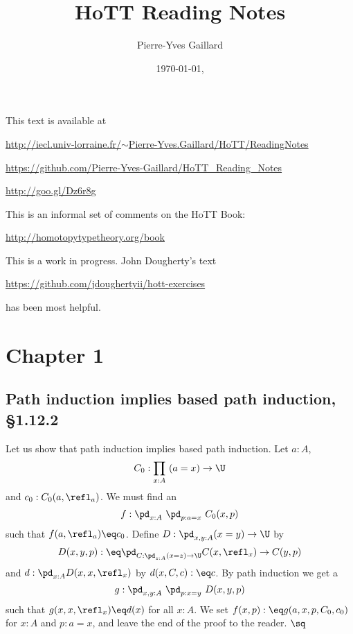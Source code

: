 \documentclass[12pt]{article}
\title{HoTT Reading Notes}
\author{Pierre-Yves Gaillard}
\date{\today, \currenttime}
\begin{document}

\maketitle%

\nn This text is available at 

\nn\href{http://iecl.univ-lorraine.fr/~Pierre-Yves.Gaillard/HoTT/ReadingNotes}{http://iecl.univ-lorraine.fr/$\sim$Pierre-Yves.Gaillard/HoTT/ReadingNotes}


\nn\href{https://github.com/Pierre-Yves-Gaillard/HoTT_Reading_Notes}{https://github.com/Pierre-Yves-Gaillard/HoTT\_Reading\_Notes}

\nn\href{http://goo.gl/Dz6r8g}{http://goo.gl/Dz6r8g}

This is an informal set of comments on the HoTT Book:

\nn\href{http://homotopytypetheory.org/book}{http://homotopytypetheory.org/book}

This is a work in progress. John Dougherty's text 

\nn\href{https://github.com/jdoughertyii/hott-exercises}{https://github.com/jdoughertyii/hott-exercises}

\nn has been most helpful.

\tableofcontents


\section{Chapter 1}

\subsection{Path induction implies based path induction, \S1.12.2}%

Let us show that path induction implies based path induction. Let $a:A$, 
$$
C_0:\prod_{x:A}\ (a=x)\to\U
$$ 
and $c_0:C_0(a,\refl_a)$. We must find an 
$$
f:\pd_{x:A}\ \pd_{p:a=x}\ C_0(x,p)
$$ 
such that $f(a,\refl_a)\eq c_0$. Define $D:\pd_{x,y:A}(x=y)\to\U$ by 
$$
D(x,y,p):\eq\pd_{C:\pd_{z:A}(x=z)\to\U}C(x,\refl_x)\to C(y,p)
$$ 
and $d:\pd_{x:A}D(x,x,\refl_x)$ by $d(x,C,c):\eq c$. By path induction we get a 
$$
g:\pd_{x,y:A}\ \pd_{p:x=y}\ D(x,y,p)
$$ 
such that $g(x,x,\refl_x)\eq d(x)$ for all $x:A$. We set $f(x,p):\eq g(a,x,p,C_0,c_0)$ for $x:A$ and $p:a=x$, and leave the end of the proof to the reader. $\sq$
\end{document}

